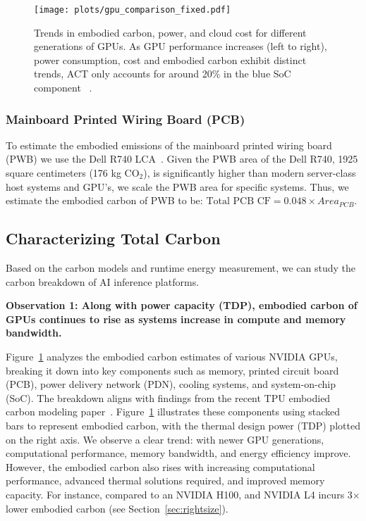 \begin{figure}[t]
\texttt{[image: plots/gpu\_comparison\_fixed.pdf]}
\vspace{-1.5em}
    \caption{Trends in embodied carbon, power, and cloud cost for different generations of GPUs. As GPU performance increases (left to right), power consumption, cost and embodied carbon exhibit distinct trends, ACT only accounts for around 20\% in the blue SoC component ~\cite{aws-gpu,azure-gpu,lambdalabsCloudDeep}.  }
    \label{fig:cf_gpu}
    \vspace{-1em}
\end{figure}




\subsubsection{Mainboard Printed Wiring Board (PCB)}
To estimate the embodied emissions of the mainboard printed wiring board (PWB) we use the Dell R740 LCA~\cite{dellr740}. 
Given the PWB area of the Dell R740, 1925 square centimeters (176 kg CO$_2$), is significantly higher than modern server-class host systems and GPU's, we scale the PWB area for specific systems.
Thus, we estimate the embodied carbon of PWB to be:
$
    \text{Total PCB CF} = 0.048 \times Area_{PCB}
$.














\subsection{Characterizing Total Carbon}\label{sec:characterization}
Based on the carbon models and runtime energy measurement, we can study the carbon breakdown of AI inference platforms. 








\textbf{Observation 1: Along with power capacity (TDP), embodied carbon of GPUs continues to rise as systems increase in compute and memory bandwidth. }




Figure~\ref{fig:cf_gpu}  analyzes the embodied carbon estimates of various NVIDIA GPUs, breaking it down into key components such as memory, printed circuit board (PCB), power delivery network (PDN), cooling systems, and system-on-chip (SoC). The breakdown aligns with findings from the recent TPU embodied carbon modeling paper~\cite{schneider2025life}.  Figure~\ref{fig:cf_gpu} illustrates these components using stacked bars to represent embodied carbon, with the thermal design power (TDP) plotted on the right axis. We observe a clear trend: with newer GPU generations, computational performance, memory bandwidth, and energy efficiency improve. However, the embodied carbon also rises with increasing computational performance, advanced thermal solutions required, and improved memory capacity. 
For instance, compared to an NVIDIA H100, and NVIDIA L4 incurs 3$\times$ lower embodied carbon (see Section~\ref{sec:rightsize}).


